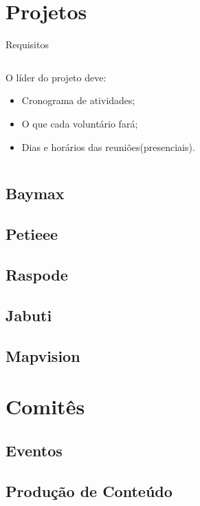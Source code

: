 \section{Projetos}
\begin{frame}{Requisitos}
    \begin{columns}
        
        \begin{column}{0.6\textwidth}
            O líder do projeto deve:
            \begin{itemize}
                \item Cronograma de atividades;
                \item O que cada voluntário fará;
                \item Dias e horários das reuniões(presenciais).
            \end{itemize}
        \end{column}

        \begin{column}{0.4\textwidth}

        \end{column}

    \end{columns}
\end{frame}
\subsection*{Baymax}
\subsection*{Petieee}
\subsection*{Raspode}
\subsection*{Jabuti}
\subsection*{Mapvision}

\section{Comitês}
\subsection*{Eventos}
\subsection*{Produção de Conteúdo}
